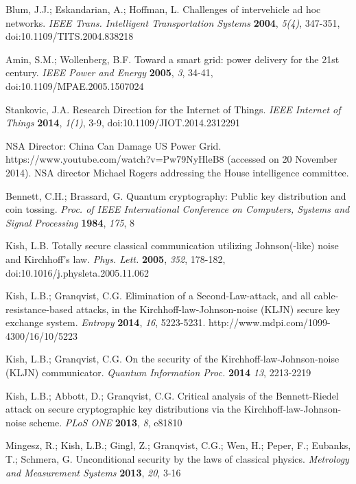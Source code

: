\documentclass[a4paper,12pt,pdftex]{article}
\begin{document}

\makeatletter
\renewcommand\@biblabel[1]{#1. }
\makeatother

\begin{thebibliography}{99} 


Blum, J.J.; Eskandarian, A.; Hoffman, L. Challenges of intervehicle ad hoc networks. {\em IEEE Trans. Intelligent Transportation Systems} {\bf 2004}, {\em 5(4)}, 347-351, doi:10.1109/TITS.2004.838218

Amin, S.M.; Wollenberg, B.F. Toward a smart grid: power delivery for the 21st century. {\em IEEE Power and Energy} {\bf 2005}, {\em 3}, 34-41, doi:10.1109/MPAE.2005.1507024

Stankovic, J.A. Research Direction for the Internet of Things. {\em IEEE Internet of Things} {\bf 2014}, {\em 1(1)}, 3-9, doi:10.1109/JIOT.2014.2312291


NSA Director: China Can Damage US Power Grid. https://www.youtube.com/watch?v=Pw79NyHleB8 (accessed on 20 November 2014). NSA director Michael Rogers addressing the House intelligence committee.

Bennett, C.H.; Brassard, G. Quantum cryptography: Public key distribution and coin tossing. {\em Proc. of IEEE International Conference on Computers, Systems and Signal Processing} {\bf 1984}, {\em 175}, 8


Kish, L.B. Totally secure classical communication utilizing Johnson(-like) noise and Kirchhoff's law. {\em Phys. Lett.} {\bf 2005}, {\em 352}, 178-182, doi:10.1016/j.physleta.2005.11.062

Kish, L.B.; Granqvist, C.G. Elimination of a Second-Law-attack, and all cable-resistance-based attacks, in the Kirchhoff-law-Johnson-noise (KLJN) secure key exchange system. {\em Entropy} {\bf 2014}, {\em 16}, 5223-5231. http://www.mdpi.com/1099-4300/16/10/5223

Kish, L.B.; Granqvist, C.G. On the security of the Kirchhoff-law-Johnson-noise (KLJN) communicator. {\em Quantum Information Proc.} {\bf 2014} {\em 13}, 2213-2219

Kish, L.B.; Abbott, D.; Granqvist, C.G. Critical analysis of the Bennett-Riedel attack on secure cryptographic key distributions via the Kirchhoff-law-Johnson-noise scheme. {\em PLoS ONE} {\bf 2013}, {\em 8}, e81810


Mingesz, R.; Kish, L.B.; Gingl, Z.; Granqvist, C.G.; Wen, H.; Peper, F.; Eubanks, T.; Schmera, G. Unconditional security by the laws of classical physics. {\em Metrology and Measurement Systems} {\bf 2013}, {\em 20}, 3-16


\end{thebibliography}
\end{document}
